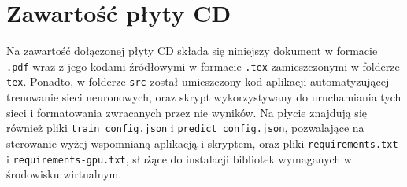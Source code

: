 \chapter{Zawartość płyty CD}
\thispagestyle{chapterBeginStyle}
\label{plytaCD}

Na zawartość dołączonej płyty CD składa się niniejszy dokument w formacie \verb|.pdf| wraz z jego kodami źródłowymi w formacie \verb|.tex| zamieszczonymi w folderze \verb|tex|. Ponadto, w folderze \verb|src| został umieszczony kod aplikacji automatyzującej trenowanie sieci neuronowych, oraz skrypt wykorzystywany do uruchamiania tych sieci i formatowania zwracanych przez nie wyników. Na płycie znajdują się również pliki \verb|train_config.json| i \verb|predict_config.json|, pozwalające na sterowanie wyżej wspomnianą aplikacją i skryptem, oraz pliki \verb|requirements.txt| i \verb|requirements-gpu.txt|, służące do instalacji bibliotek wymaganych w środowisku wirtualnym.
